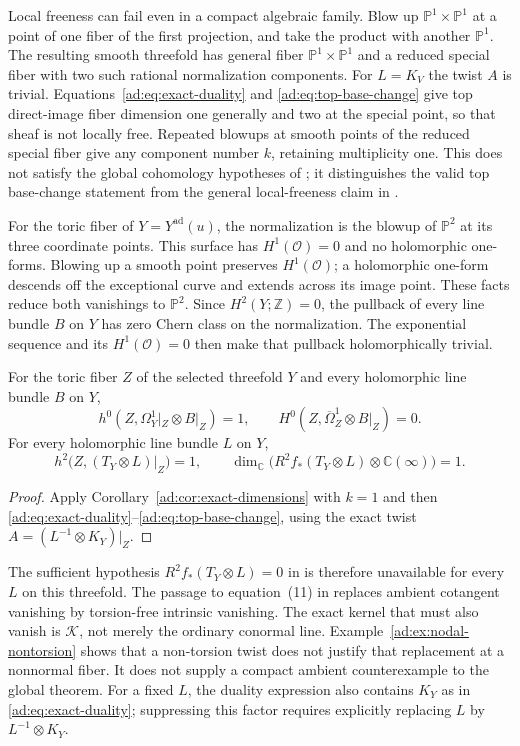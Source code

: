 \documentclass[11pt]{article}
\numberwithin{equation}{section}
\begin{document}
Local freeness can fail even in a compact algebraic family.
Blow up $\mathbb P^1\times\mathbb P^1$ at a point of one fiber of
the first projection, and take the product with another
$\mathbb P^1$. The resulting smooth threefold has general fiber
$\mathbb P^1\times\mathbb P^1$ and a reduced special fiber with
two such rational normalization components. For $L=K_V$ the twist
$A$ is trivial. Equations~\eqref{ad:eq:exact-duality} and
\eqref{ad:eq:top-base-change} give top direct-image fiber dimension
one generally and two at the special point, so that sheaf is not
locally free. Repeated blowups at smooth points of the reduced
special fiber give any component number $k$, retaining
multiplicity one. This does not satisfy the global cohomology
hypotheses of \cite[Theorem~2.2]{CDP2020}; it distinguishes the
valid top base-change statement from the general local-freeness
claim in \cite[Lemma~1.5]{CDP1998}.

For the toric fiber of $Y=Y^{\mathrm{ad}}(u)$, the normalization is
the blowup of $\mathbb P^2$ at its three coordinate points.
This surface has $H^1(\mathcal O)=0$ and no holomorphic one-forms.
Blowing up a smooth point preserves $H^1(\mathcal O)$; a
holomorphic one-form descends off the exceptional curve and extends
across its image point. These facts reduce both vanishings to
$\mathbb P^2$. Since $H^2(Y;\mathbb Z)=0$, the pullback of every
line bundle $B$ on $Y$ has zero Chern class on the normalization.
The exponential sequence and its $H^1(\mathcal O)=0$ then make that
pullback holomorphically trivial.

\begin{corollary}\label{ad:cor:ambient-nonvanishing}
For the toric fiber $Z$ of the selected threefold $Y$ and every
holomorphic line bundle $B$ on $Y$,
\[
 h^0(Z,\Omega_Y^1|_Z\otimes B|_Z)=1,\qquad
 H^0(Z,\overline\Omega_Z^1\otimes B|_Z)=0.
\]
For every holomorphic line bundle $L$ on $Y$,
\[
 h^2\bigl(Z,(T_Y\otimes L)|_Z\bigr)=1,
 \qquad
 \dim_{\mathbb C}\bigl(R^2f_*(T_Y\otimes L)\otimes\mathbb C(\infty)\bigr)=1.
\]
\end{corollary}

\begin{proof}
Apply Corollary~\ref{ad:cor:exact-dimensions} with $k=1$ and then
\eqref{ad:eq:exact-duality}--\eqref{ad:eq:top-base-change}, using
the exact twist $A=(L^{-1}\otimes K_Y)|_Z$.
\end{proof}

The sufficient hypothesis $R^2f_*(T_Y\otimes L)=0$ in
\cite[Proposition~2.4]{CDP2020} is therefore unavailable for every
$L$ on this threefold. The passage to equation~(11) in
\cite[\S7, p.~692]{CDP2020} replaces ambient cotangent vanishing
by torsion-free intrinsic vanishing. The exact kernel that must
also vanish is $\mathcal K$, not merely the ordinary conormal
line. Example~\ref{ad:ex:nodal-nontorsion} shows that a non-torsion
twist does not justify that replacement at a nonnormal fiber.
It does not supply a compact ambient counterexample to the global
theorem. For a fixed $L$, the duality expression also contains
$K_Y$ as in \eqref{ad:eq:exact-duality}; suppressing this factor
requires explicitly replacing $L$ by $L^{-1}\otimes K_Y$.
\end{document}
